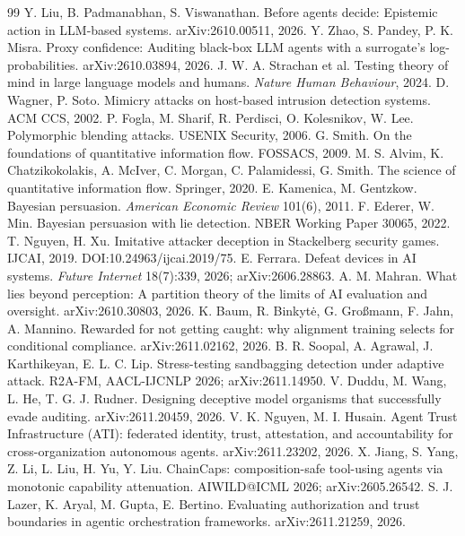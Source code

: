 \documentclass[10pt,twocolumn]{article}
\begin{document}
\begin{thebibliography}{99}
 Y. Liu, B. Padmanabhan, S. Viswanathan. Before agents decide: Epistemic action in LLM-based systems. arXiv:2610.00511, 2026.
 Y. Zhao, S. Pandey, P. K. Misra. Proxy confidence: Auditing black-box LLM agents with a surrogate's log-probabilities. arXiv:2610.03894, 2026.
 J. W. A. Strachan et al. Testing theory of mind in large language models and humans. \emph{Nature Human Behaviour}, 2024.
 D. Wagner, P. Soto. Mimicry attacks on host-based intrusion detection systems. ACM CCS, 2002.
 P. Fogla, M. Sharif, R. Perdisci, O. Kolesnikov, W. Lee. Polymorphic blending attacks. USENIX Security, 2006.
 G. Smith. On the foundations of quantitative information flow. FOSSACS, 2009.
 M. S. Alvim, K. Chatzikokolakis, A. McIver, C. Morgan, C. Palamidessi, G. Smith. The science of quantitative information flow. Springer, 2020.
 E. Kamenica, M. Gentzkow. Bayesian persuasion. \emph{American Economic Review} 101(6), 2011.
 F. Ederer, W. Min. Bayesian persuasion with lie detection. NBER Working Paper 30065, 2022.
 T. Nguyen, H. Xu. Imitative attacker deception in Stackelberg security games. IJCAI, 2019. DOI:10.24963/ijcai.2019/75.
 E. Ferrara. Defeat devices in AI systems. \emph{Future Internet} 18(7):339, 2026; arXiv:2606.28863.
 A. M. Mahran. What lies beyond perception: A partition theory of the limits of AI evaluation and oversight. arXiv:2610.30803, 2026.
 K. Baum, R. Binkyt\.{e}, G. Gro{\ss}mann, F. Jahn, A. Mannino. Rewarded for not getting caught: why alignment training selects for conditional compliance. arXiv:2611.02162, 2026.
 B. R. Soopal, A. Agrawal, J. Karthikeyan, E. L. C. Lip. Stress-testing sandbagging detection under adaptive attack. R2A-FM, AACL-IJCNLP 2026; arXiv:2611.14950.
 V. Duddu, M. Wang, L. He, T. G. J. Rudner. Designing deceptive model organisms that successfully evade auditing. arXiv:2611.20459, 2026.
 V. K. Nguyen, M. I. Husain. Agent Trust Infrastructure (ATI): federated identity, trust, attestation, and accountability for cross-organization autonomous agents. arXiv:2611.23202, 2026.
 X. Jiang, S. Yang, Z. Li, L. Liu, H. Yu, Y. Liu. ChainCaps: composition-safe tool-using agents via monotonic capability attenuation. AIWILD@ICML 2026; arXiv:2605.26542.
 S. J. Lazer, K. Aryal, M. Gupta, E. Bertino. Evaluating authorization and trust boundaries in agentic orchestration frameworks. arXiv:2611.21259, 2026.

\end{thebibliography}
\end{document}
